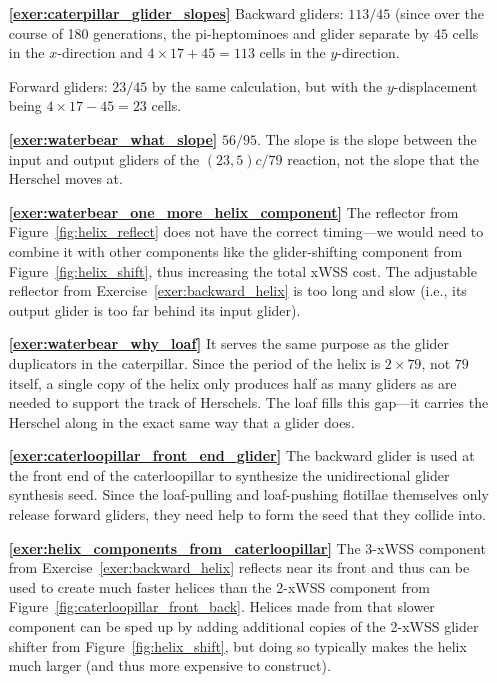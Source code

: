 \begin{multicols}{2}
\begin{itemize}[leftmargin=0em]
		
		\item[\bf\color{ocre}\sffamily\ref{exer:caterpillar_glider_slopes}] Backward gliders: $113/45$ (since over the course of 180 generations, the pi-heptominoes and glider separate by $45$ cells in the $x$-direction and $4 \times 17 + 45 = 113$ cells in the $y$-direction.
		
		Forward gliders: $23/45$ by the same calculation, but with the $y$-displacement being $4 \times 17 - 45 = 23$ cells.\\
		
		
		\item[\bf\color{ocre}\sffamily\ref{exer:waterbear_what_slope}] $56/95$. The slope is the slope between the input and output gliders of the $(23,5)c/79$ reaction, not the slope that the Herschel moves at.\\
		
		
		\item[\bf\color{ocre}\sffamily\ref{exer:waterbear_one_more_helix_component}] The reflector from Figure~\ref{fig:helix_reflect} does not have the correct timing---we would need to combine it with other components like the glider-shifting component from Figure~\ref{fig:helix_shift}, thus increasing the total xWSS cost. The adjustable reflector from Exercise~\ref{exer:backward_helix} is too long and slow (i.e., its output glider is too far behind its input glider).\\
		
		
		\item[\bf\color{ocre}\sffamily\ref{exer:waterbear_why_loaf}] It serves the same purpose as the glider duplicators in the caterpillar. Since the period of the helix is $2 \times 79$, not $79$ itself, a single copy of the helix only produces half as many gliders as are needed to support the track of Herschels. The loaf fills this gap---it carries the Herschel along in the exact same way that a glider does.\\
		
		
		\item[\bf\color{ocre}\sffamily\ref{exer:caterloopillar_front_end_glider}] The backward glider is used at the front end of the caterloopillar to synthesize the unidirectional glider synthesis seed. Since the loaf-pulling and loaf-pushing flotillae themselves only release forward gliders, they need help to form the seed that they collide into.\\
		
		
		\item[\bf\color{ocre}\sffamily\ref{exer:helix_components_from_caterloopillar}] The 3-xWSS component from Exercise~\ref{exer:backward_helix} reflects near its front and thus can be used to create much faster helices than the 2-xWSS component from Figure~\ref{fig:caterloopillar_front_back}. Helices made from that slower component can be sped up by adding additional copies of the 2-xWSS glider shifter from Figure~\ref{fig:helix_shift}, but doing so typically makes the helix much larger (and thus more expensive to construct).\\
		

\end{itemize}
\end{multicols}
